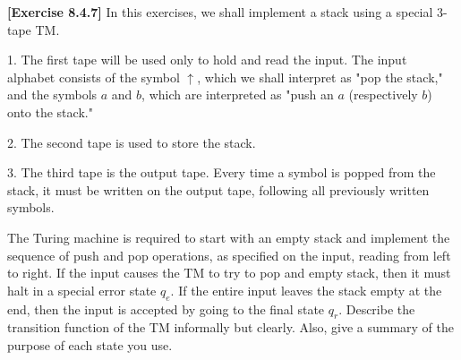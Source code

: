 \textbf{[Exercise 8.4.7]} In this exercises, we shall implement a stack using a special
3-tape TM.

1. The first tape will be used only to hold and read the input. The input
alphabet consists of the symbol $\uparrow$, which we shall interpret as "pop the
stack," and the symbols $a$ and $b$, which are interpreted as "push an $a$
(respectively $b$) onto the stack."

2. The second tape is used to store the stack.

3. The third tape is the output tape. Every time a symbol is popped from
the stack, it must be written on the output tape, following all previously
written symbols.

The Turing machine is required to start with an empty stack and implement the
sequence of push and pop operations, as specified on the input, reading from
left to right. If the input causes the TM to try to pop and empty stack, then it
must halt in a special error state $q_e$. If the entire input leaves the stack empty
at the end, then the input is accepted by going to the final state $q_r$. Describe
the transition function of the TM informally but clearly. Also, give a summary
of the purpose of each state you use.
